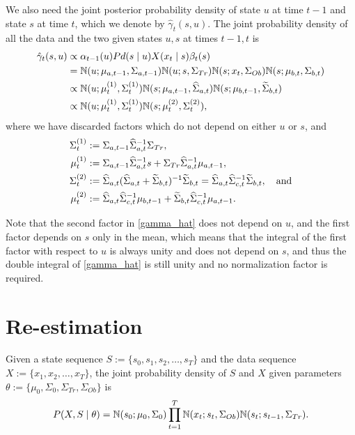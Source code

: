 \documentclass[12pt,leqno]{article}
\begin{document}
We also need the joint posterior probability density of state $u$ at time $t-1$ and state $s$ at time $t$,
which we denote by $\hat{\gamma}_t(s,u)$. The joint probability density of all the data and the two given states
  $u,s$  at times $t-1,t$ is
  \begin{align}
    \hat{\gamma}_t(s,u) &\propto \alpha_{t-1}(u)Pd(s\mid u)X(x_t\mid s)\beta_t(s) \notag\\
    &= {\mathbb N}(u;\mu_{a,t-1},\Sigma_{a,t-1}){\mathbb N}(u;s,\Sigma_{Tr})  {\mathbb N}(s;x_t,\Sigma_{Ob}){\mathbb N}(s;\mu_{b,t},\Sigma_{b,t})\notag\\
    &\propto {\mathbb N}(u;\mu^{(1)}_t,\Sigma^{(1)}_t){\mathbb N}(s;\mu_{a,t-1},\widehat{\Sigma}_{a,t}){\mathbb N}(s;\mu_{b,t-1},
    \widetilde{\Sigma}_{b,t})\notag\\
    &\propto {\mathbb N}(u;\mu^{(1)}_t,\Sigma^{(1)}_t){\mathbb N}(s;\mu^{(2)}_t,\Sigma^{(2)}_t),\label{gamma_hat}
  \end{align}
  where we have discarded factors which do not depend on either $u$ or $s$, and 
  \begin{align}
    \Sigma^{(1)}_t &:= \Sigma_{a,t-1}\widehat{\Sigma}_{a,t}^{-1}\Sigma_{Tr},\notag\\
    \mu^{(1)}_t &:= \Sigma_{a,t-1}\widehat{\Sigma}_{a,t}^{-1}s + \Sigma_{Tr}\widehat{\Sigma}_{a,t}^{-1}\mu_{a,t-1},\label{mu(1)}\\
    \Sigma^{(2)}_t &:= \widehat{\Sigma}_{a,t}(\widehat{\Sigma}_{a,t}+\widetilde{\Sigma}_{b,t})^{-1}\widetilde{\Sigma}_{b,t}
    = \widehat{\Sigma}_{a,t}\widehat{\Sigma}_{c,t}^{-1}\widetilde{\Sigma}_{b,t},\notag\quad\text{and}\\
    \mu^{(2)}_t &:= \widehat{\Sigma}_{a,t}\widehat{\Sigma}_{c,t}^{-1}\mu_{b,t-1} +
    \widetilde{\Sigma}_{b,t}\widehat{\Sigma}_{c,t}^{-1}\mu_{a,t-1}\label{mu(2)}.
  \end{align}

  Note that the second factor in \eqref{gamma_hat} does not depend on $u$, and the first factor depends on $s$
  only in the mean, which means that the integral of the first factor with respect to $u$ is always unity
  and does not depend on $s$, and thus the double integral of \eqref{gamma_hat} is still unity and no
  normalization factor is required.
  
\section{Re-estimation}
Given a state sequence $S := \{s_0,s_1,s_2,\dots,s_T\}$ and the data sequence $X := \{x_1,x_2,\dots,x_T\}$, the
joint probability density of $S$ and $X$ given parameters $\theta := \{\mu_0,\Sigma_0,\Sigma_{Tr},\Sigma_{Ob}\}$ is
$$
P(X,S\mid\theta) = {\mathbb N}(s_0;\mu_0,\Sigma_0)\prod_{t=1}^T{\mathbb N}(x_t;s_t,\Sigma_{Ob}){\mathbb N}(s_t;s_{t-1},\Sigma_{Tr}).
$$
\end{document}
